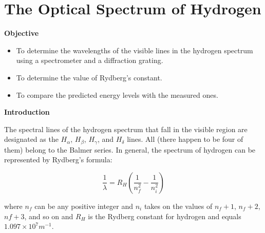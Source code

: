 
\setcounter{equation}{0}
\setcounter{figure}{0}

\section{The Optical Spectrum of Hydrogen}

\makelabheader %

\textbf{Objective}

\begin{itemize}

\item To determine the wavelengths of the visible lines in the hydrogen spectrum using         
a spectrometer and a diffraction grating.

\item To determine the value of Rydberg's constant.

\item To compare the predicted energy levels with the measured ones.

\end{itemize}

\textbf{Introduction}

\bigskip
 
The spectral lines of the hydrogen spectrum that fall in the visible region are designated as 
the $H_\alpha$, 
$H_\beta$, $H_\gamma$, and $H_\delta$  lines.  
All (there happen to be four of them) belong to the Balmer series.  
In general, the spectrum of hydrogen can be represented by Rydberg's formula:

\begin{equation}
\frac{1}{\lambda} = R_H \left ( \frac{1}{n_f^2} - \frac{1}{n_i^2} \right )
\end{equation}

\noindent where $n_f$ can be any positive integer and $n_i$ 
takes on the values of $n_f + 1$, $n_f + 2$, 
$nf + 3$, and so on and $R_H$ is the Rydberg constant 
for hydrogen and equals $1.097 \times 10^7 m^{-1}$.


